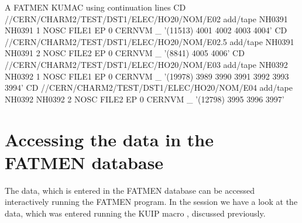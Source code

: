\begin{XMPt}{A FATMEN KUMAC using continuation lines}
CD //CERN/CHARM2/TEST/DST1/ELEC/HO20/NOM/E02
add/tape NH0391 NH0391 1  NOSC FILE1  EP 0 CERNVM _
'(11513) 4001 4002 4003 4004'
CD //CERN/CHARM2/TEST/DST1/ELEC/HO20/NOM/E02.5
add/tape NH0391 NH0391 2  NOSC FILE2  EP 0 CERNVM _
'(8841)  4005 4006'
CD //CERN/CHARM2/TEST/DST1/ELEC/HO20/NOM/E03
add/tape NH0392 NH0392 1  NOSC FILE1  EP 0 CERNVM _
'(19978) 3989 3990 3991 3992 3993 3994'
CD //CERN/CHARM2/TEST/DST1/ELEC/HO20/NOM/E04
add/tape NH0392 NH0392 2  NOSC FILE2  EP 0 CERNVM _
'(12798) 3995 3996 3997'
\end{XMPt}

\section{Accessing the data in the FATMEN database}

The data, which is entered in the FATMEN database can be accessed
interactively running the FATMEN program.
In the session we have a look at the
data, which was entered running the KUIP macro ,
discussed previously.

